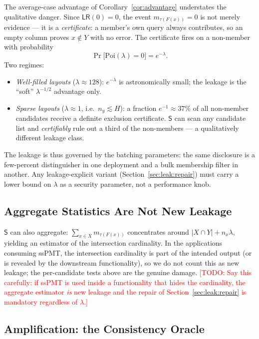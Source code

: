 \documentclass[runningheads]{llncs}
\newcommand{\TODO}[1]{\textcolor{red}{[TODO: #1]}}
\newcommand{\Snd}{\mathsf{S}}                %
\newcommand{\half}{H}                        %
\newcommand{\Poi}{\mathrm{Poi}}
\newcommand{\LR}{\mathsf{LR}}
\begin{document}
The average-case advantage of Corollary~\ref{cor:advantage} understates the
qualitative danger. Since $\LR(0)=0$, the event $m_{\tau(F(x))}=0$ is not merely
evidence --- it is a \emph{certificate}: a member's own query always contributes, so
an empty column proves $x\notin Y$ with no error. The certificate fires on a
non-member with probability
\[
  \Pr\big[\Poi(\lambda)=0\big]=e^{-\lambda}.
\]
Two regimes:
\begin{itemize}
  \item \emph{Well-filled layouts} ($\lambda\approx128$): $e^{-\lambda}$ is
  astronomically small; the leakage is the ``soft'' $\lambda^{-1/2}$ advantage only.
  \item \emph{Sparse layouts} ($\lambda\approx1$, i.e.\ $n_y\lesssim\half$): a
  fraction $e^{-1}\approx37\%$ of all non-member candidates receive a definite
  exclusion certificate. $\Snd$ can scan any candidate list and \emph{certifiably}
  rule out a third of the non-members --- a qualitatively different leakage class.
\end{itemize}
The leakage is thus governed by the batching parameters: the same disclosure is a
few-percent distinguisher in one deployment and a bulk membership filter in another.
Any leakage-explicit variant (Section~\ref{sec:leak:repair}) must carry a lower bound
on $\lambda$ as a security parameter, not a performance knob.

\subsection{Aggregate Statistics Are Not New Leakage}
\label{sec:leak:aggregate}

$\Snd$ can also aggregate: $\sum_{x\in X}m_{\tau(F(x))}$ concentrates around
$|X\cap Y|+n_x\lambda$, yielding an estimator of the intersection cardinality. In the
applications consuming ssPMT, the intersection cardinality is part of the intended
output (or is revealed by the downstream functionality), so we do not count this as
new leakage; the per-candidate tests above are the genuine damage. \TODO{Say this
carefully: if ssPMT is used inside a functionality that hides the cardinality, the
aggregate estimator \emph{is} new leakage and the repair of
Section~\ref{sec:leak:repair} is mandatory regardless of $\lambda$.}

\subsection{Amplification: the Consistency Oracle}
\label{sec:leak:oracle}
\end{document}
